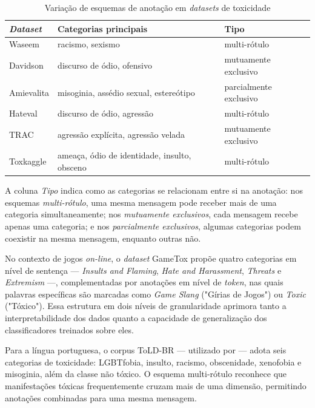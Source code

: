 \documentclass{eic-bcc-tcc}
\begin{document}
\begin{table}[h!]
\centering
\small
\begin{tabular}{lll}
\hline
\textbf{\textit{Dataset}} & \textbf{Categorias principais} & \textbf{Tipo} \\ \hline
Waseem          & racismo, sexismo                             & multi-rótulo \\
Davidson        & discurso de ódio, ofensivo                  & mutuamente exclusivo \\
Amievalita      & misoginia, assédio sexual, estereótipo      & parcialmente exclusivo \\
Hateval         & discurso de ódio, agressão                  & multi-rótulo \\
TRAC            & agressão explícita, agressão velada         & mutuamente exclusivo \\
Toxkaggle       & ameaça, ódio de identidade, insulto, obsceno & multi-rótulo \\ \hline
\end{tabular}
\caption{Variação de esquemas de anotação em \textit{datasets} de toxicidade \cite{fortuna2020toxic}}
\label{tab:taxliteratura}
\end{table}

A coluna \textit{Tipo} indica como as categorias se relacionam entre si na anotação: nos esquemas \textit{multi-rótulo}, uma mesma mensagem pode receber mais de uma categoria simultaneamente; nos \textit{mutuamente exclusivos}, cada mensagem recebe apenas uma categoria; e nos \textit{parcialmente exclusivos}, algumas categorias podem coexistir na mesma mensagem, enquanto outras não.

No contexto de jogos \textit{on-line}, o \textit{dataset} GameTox \cite{naseem-etal-2025-gametox} propõe quatro categorias em nível de sentença — \textit{Insults and Flaming}, \textit{Hate and Harassment}, \textit{Threats} e \textit{Extremism} —, complementadas por anotações em nível de \textit{token}, nas quais palavras específicas são marcadas como \textit{Game Slang} ("Gírias de Jogos") ou \textit{Toxic} ("Tóxico"). Essa estrutura em dois níveis de granularidade aprimora tanto a interpretabilidade dos dados quanto a capacidade de generalização dos classificadores treinados sobre eles.

Para a língua portuguesa, o corpus ToLD-BR — utilizado por \cite{ricarte2025contextual} — adota seis categorias de toxicidade: LGBTfobia, insulto, racismo, obscenidade, xenofobia e misoginia, além da classe não tóxico. O esquema multi-rótulo reconhece que manifestações tóxicas frequentemente cruzam mais de uma dimensão, permitindo anotações combinadas para uma mesma mensagem.
\end{document}
